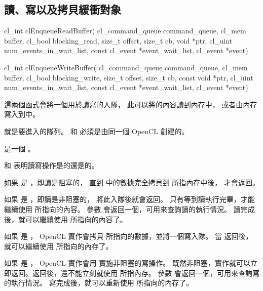 \subsection{讀、寫以及拷貝緩衝對象}



\startCLFUNC
cl_int clEnqueueReadBuffer(
			cl_command_queue command_queue,
			cl_mem buffer,
			cl_bool blocking_read,
			size_t offset,
			size_t cb,
			void *ptr,
			cl_uint num_events_in_wait_list,
			const cl_event *event_wait_list,
			cl_event *event)

cl_int clEnqueueWriteBuffer(
			cl_command_queue command_queue,
			cl_mem buffer,
			cl_bool blocking_write,
			size_t offset,
			size_t cb,
			const void *ptr,
			cl_uint num_events_in_wait_list,
			const cl_event *event_wait_list,
			cl_event *event)
\stopCLFUNC

這兩個函式會將一個用於讀寫的入隊，
此可以將的內容讀到內存中，
或者由內存寫入到中。

 就是要進入的隊列。
 和  必須是由同一個 OpenCL 創建的。

 是一個 。

 和 
表明讀寫操作是{}的還是{}的。

如果  是 ，即讀是阻塞的，
直到  中的數據完全拷貝到  所指內存中後，
 才會返回。

如果  是 ，即讀是非阻塞的，
 將此入隊後就會返回。
只有等到讀執行完畢，才能繼續使用  所指向的內容。
參數  會返回一個，可用來查詢讀的執行情況。
讀完成後，就可以繼續使用  所指向的內容了。

如果  是 ，
OpenCL 實作會拷貝  所指向的數據，並將一個寫入隊。
當  返回後，
就可以繼續使用  所指向的內存了。

如果  是 ，
OpenCL 實作會用  實施非阻塞的寫操作。
既然非阻塞，實作就可以立即返回。返回後，還不能立刻就使用  所指內存。
參數  會返回一個，可用來查詢寫的執行情況。
寫完成後，就可以重新使用  所指向的內存了。

